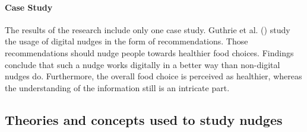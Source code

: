 \paragraph{Case Study}
The results of the research include only one case study. Guthrie et al. (\citeyear{guthrie_nudging_2015}) study the usage of digital nudges in the form of recommendations. Those recommendations should nudge people towards healthier food choices. Findings conclude that such a nudge works digitally in a better way than non-digital nudges do. Furthermore, the overall food choice is perceived as healthier, whereas the understanding of the information still is an intricate part.




\subsection{Theories and concepts used to study nudges}


